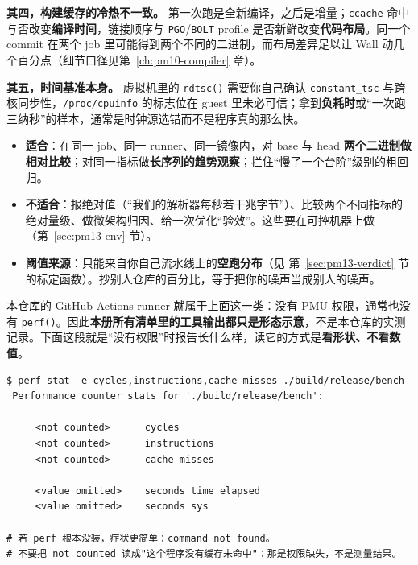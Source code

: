 \documentclass[12pt,a4paper,fontset=fandol]{ctexbook}
\newcommand{\Fn}[1]{\texttt{#1()}}
\newcommand{\Tp}[1]{\texttt{#1}}
\newcommand{\Bk}{\discretionary{}{}{}}
\newcommand{\Lang}[1]{\textsf{#1}}
\newcommand{\MWall}{\Lang{Wall}}
\begin{document}
\textbf{其四，构建缓存的冷热不一致。} 第一次跑是全新编译，之后是增量；\Tp{ccache} 命中与否改变\textbf{编译时间}，链接顺序与 \Tp{PGO}/\Tp{BOLT} profile 是否新鲜改变\textbf{代码布局}。同一个 commit 在两个 job 里可能得到两个不同的二进制，而布局差异足以让 \MWall{} 动几个百分点（细节口径见第~\ref{ch:pm10-compiler} 章）。

\textbf{其五，时间基准本身。} 虚拟机里的 \Fn{rdtsc} 需要你自己确认 \Tp{constant{\Bk}\_tsc} 与跨核同步性，\Tp{/proc/cpuinfo} 的标志位在 guest 里未必可信；拿到\textbf{负耗时}或``一次跑三纳秒''的样本，通常是时钟源选错而不是程序真的那么快。

\begin{guideline}[title={CI 性能数的正确用法}]
\label{box:pm13-usage}
\begin{itemize}
\item \textbf{适合}：在同一 job、同一 runner、同一镜像内，对 base 与 head \textbf{两个二进制做相对比较}；对同一指标做\textbf{长序列的趋势观察}；拦住``慢了一个台阶''级别的粗回归。
\item \textbf{不适合}：报绝对值（``我们的解析器每秒若干兆字节''）、比较两个不同指标的绝对量级、做微架构归因、给一次优化``验效''。这些要在可控机器上做（第~\ref{sec:pm13-env} 节）。
\item \textbf{阈值来源}：只能来自你自己流水线上的\textbf{空跑分布}（见 第~\ref{sec:pm13-verdict} 节 的标定函数）。抄别人仓库的百分比，等于把你的噪声当成别人的噪声。
\end{itemize}
\end{guideline}

本仓库的 GitHub Actions runner 就属于上面这一类：没有 PMU 权限，通常也没有 \Fn{perf}。因此\textbf{本册所有清单里的工具输出都只是形态示意}，不是本仓库的实测记录。下面这段就是``没有权限''时报告长什么样，读它的方式是\textbf{看形状、不看数值}。

\begin{lstlisting}[style=outstyle, caption={形态示意（非本仓库实测值）：无 PMU 权限环境下
硬件事件整列为 not counted，只剩时间行可读；数值一律留白}, label={lst:pm13-notcounted}]
$ perf stat -e cycles,instructions,cache-misses ./build/release/bench
 Performance counter stats for './build/release/bench':

     <not counted>      cycles
     <not counted>      instructions
     <not counted>      cache-misses

     <value omitted>    seconds time elapsed
     <value omitted>    seconds sys

# 若 perf 根本没装，症状更简单：command not found。
# 不要把 not counted 读成"这个程序没有缓存未命中"：那是权限缺失，不是测量结果。
\end{lstlisting}
\end{document}
